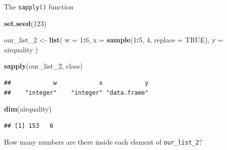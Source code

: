 \documentclass[ignorenonframetext,]{beamer}
\newenvironment{Shaded}{\begin{snugshade}}{\end{snugshade}}
\newcommand{\DataTypeTok}[1]{\textcolor[rgb]{0.13,0.29,0.53}{#1}}
\newcommand{\DecValTok}[1]{\textcolor[rgb]{0.00,0.00,0.81}{#1}}
\newcommand{\KeywordTok}[1]{\textcolor[rgb]{0.13,0.29,0.53}{\textbf{#1}}}
\newcommand{\NormalTok}[1]{#1}
\newcommand{\OperatorTok}[1]{\textcolor[rgb]{0.81,0.36,0.00}{\textbf{#1}}}
\newcommand{\OtherTok}[1]{\textcolor[rgb]{0.56,0.35,0.01}{#1}}
\newcommand{\StringTok}[1]{\textcolor[rgb]{0.31,0.60,0.02}{#1}}
\begin{document}
\begin{frame}[fragile]{The \texttt{sapply()} function}
\protect\hypertarget{the-sapply-function-4}{}

\begin{Shaded}
\begin{Highlighting}[]
\KeywordTok{set.seed}\NormalTok{(}\DecValTok{123}\NormalTok{)}

\NormalTok{our_list_}\DecValTok{2}\NormalTok{ <-}\StringTok{ }\KeywordTok{list}\NormalTok{(}
  \DataTypeTok{w =} \DecValTok{1}\OperatorTok{:}\DecValTok{6}\NormalTok{,}
  \DataTypeTok{x =} \KeywordTok{sample}\NormalTok{(}\DecValTok{1}\OperatorTok{:}\DecValTok{5}\NormalTok{, }\DecValTok{4}\NormalTok{, }\DataTypeTok{replace =} \OtherTok{TRUE}\NormalTok{),}
  \DataTypeTok{y =}\NormalTok{ airquality}
\NormalTok{)}
\end{Highlighting}
\end{Shaded}

\begin{Shaded}
\begin{Highlighting}[]
\KeywordTok{sapply}\NormalTok{(our_list_}\DecValTok{2}\NormalTok{, class)}
\end{Highlighting}
\end{Shaded}

\begin{verbatim}
##            w            x            y 
##    "integer"    "integer" "data.frame"
\end{verbatim}

\begin{Shaded}
\begin{Highlighting}[]
\KeywordTok{dim}\NormalTok{(airquality)}
\end{Highlighting}
\end{Shaded}

\begin{verbatim}
## [1] 153   6
\end{verbatim}

How many numbers are there inside each element of \texttt{our\_list\_2}?

\end{frame}
\end{document}
